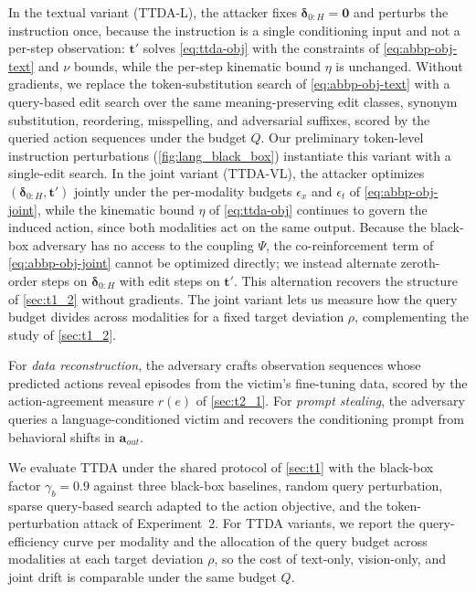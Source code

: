 \documentclass[11pt,letterpaper]{article}
\begin{document}
In the textual variant (TTDA-L), the attacker fixes $\bm{\delta}_{0:H}{=}\bm{0}$ and perturbs the instruction once, because the instruction is a single conditioning input and not a per-step observation: $\bm{t}'$ solves \autoref{eq:ttda-obj} with the constraints of \autoref{eq:abbp-obj-text} and $\nu$ bounds, while the per-step kinematic bound $\eta$ is unchanged. Without gradients, we replace the token-substitution search of \autoref{eq:abbp-obj-text} with a query-based edit search over the same meaning-preserving edit classes, \ie synonym substitution, reordering, misspelling, and adversarial suffixes, scored by the queried action sequences under the budget $Q$. %
Our preliminary token-level instruction perturbations (\autoref{fig:lang_black_box}) instantiate this variant with a single-edit search.
In the joint variant (TTDA-VL), the attacker optimizes $(\bm{\delta}_{0:H},\bm{t}')$ jointly under the per-modality budgets $\epsilon_x$ and $\epsilon_t$ of \autoref{eq:abbp-obj-joint}, while the kinematic bound $\eta$ of \autoref{eq:ttda-obj} continues to govern the induced action, since both modalities act on the same output. 
Because the black-box adversary has no access to the coupling $\Psi$, the co-reinforcement term of \autoref{eq:abbp-obj-joint} cannot be optimized directly; we instead alternate zeroth-order steps on $\bm{\delta}_{0:H}$ with edit steps on $\bm{t}'$. This alternation recovers the structure of \autoref{sec:t1_2} without gradients. 
The joint variant lets us measure how the query budget divides across modalities for a fixed target deviation $\rho$, complementing the study of \autoref{sec:t1_2}. %

 For \emph{data reconstruction}, the adversary crafts observation sequences whose predicted actions reveal episodes from the victim's fine-tuning data, scored by the action-agreement measure $r(e)$ of \autoref{sec:t2_1}. For \emph{prompt stealing}, the adversary queries a language-conditioned victim and recovers the conditioning prompt from behavioral shifts in $\bm{a}_{out}$. 

 We evaluate TTDA under the shared protocol of \autoref{sec:t1} with the black-box factor $\gamma_{b}{=}0.9$ against three black-box baselines, \ie random query perturbation, sparse query-based search adapted to the action objective, and the token-perturbation attack of Experiment~2. 
For TTDA variants, we report the query-efficiency curve per modality and the allocation of the query budget across modalities at each target deviation $\rho$, so the cost of text-only, vision-only, and joint drift is comparable under the same budget $Q$.
\end{document}
